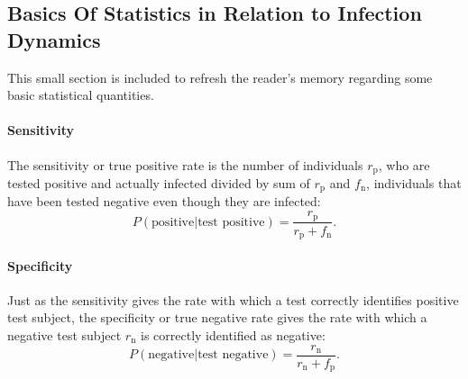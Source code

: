 \subsection{Basics Of Statistics in Relation to Infection Dynamics}
This small section is included to refresh the reader's memory regarding some basic statistical quantities. 
\paragraph{Sensitivity}
The sensitivity or true positive rate is the number of individuals $r_\text{p}$, who are tested positive and actually infected divided by sum of $r_\text{p}$ and $f_\text{n}$, individuals that have been tested negative even though they are infected:
\begin{equation}
P(\text{positive} | \text{test positive}) = \frac{r_\text{p}}{r_\text{p} + f_\text{n}}.
\end{equation}

\paragraph{Specificity}
Just as the sensitivity gives the rate with which a test correctly identifies positive test subject, the specificity or true negative rate gives the rate with which a negative test subject $r_\text{n}$ is correctly identified as negative:
\begin{equation}
P(\text{negative} | \text{test negative}) = \frac{r_\text{n}}{r_\text{n} + f_\text{p}}.
\end{equation}